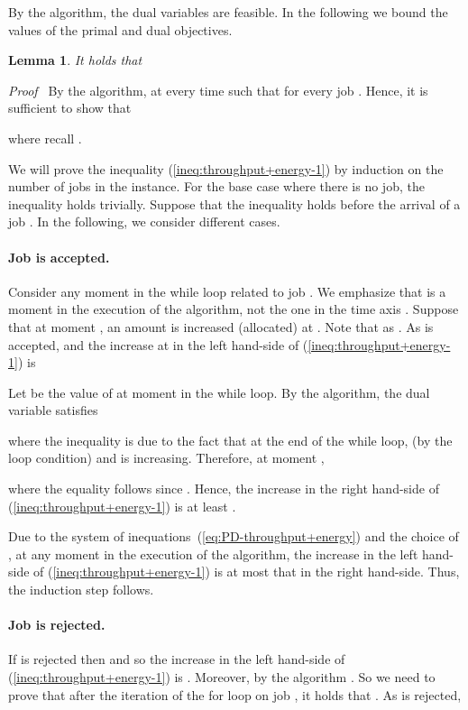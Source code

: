 \documentclass[11pt]{article}
\newenvironment{proof}{\noindent\emph{Proof\ }}{\hspace*{\fill}\medskip}
\newtheorem{lemma}{Lemma}
\begin{document}
By the algorithm, the dual variables are feasible. In the following
we bound the values of the primal and dual objectives.

\begin{lemma}		\label{lem:throughput+energy}
It holds that 

\end{lemma}
\begin{proof}
By the algorithm,  at every time  such that 
for every job . Hence, it is sufficient to show that 

where recall .

We will prove the inequality (\ref{ineq:throughput+energy-1}) 
by induction on the number of jobs in the instance. For the base case where there is 
no job, the inequality holds trivially. Suppose that the inequality holds before the arrival of a job .
In the following, we consider different cases.

\paragraph{Job  is accepted.} 
Consider any moment  in the while loop related to job . We emphasize that  is a moment 
in the execution of the algorithm, not the one in the time axis .
Suppose that at moment , an amount  is increased (allocated) at . Note that 
 as .
As  is accepted,  and 
the increase at  in the left hand-side of (\ref{ineq:throughput+energy-1})
is  

Let  be the value of  at moment  in 
the while loop.  By the algorithm, the dual variable  satisfies

where the inequality is due to the fact that at the end of the while loop, 
 (by the loop condition) and  is increasing. 
Therefore, at moment , 

where the equality follows since .
Hence, the increase in the right hand-side of (\ref{ineq:throughput+energy-1}) is at least 
.

Due to the system of inequations~(\ref{eq:PD-throughput+energy}) and the choice of , 
at any moment in the execution of the 
algorithm, the increase in the left hand-side of (\ref{ineq:throughput+energy-1}) is 
at most that in the right hand-side. Thus, the induction step follows.

\paragraph{Job  is rejected.}
If  is rejected then  and so the increase in the left hand-side of (\ref{ineq:throughput+energy-1}) 
is . Moreover, by the algorithm .
So we need to prove that after the iteration of the for loop 
on job , it holds that 
.
As  is rejected, 


\end{proof}
\end{document}
